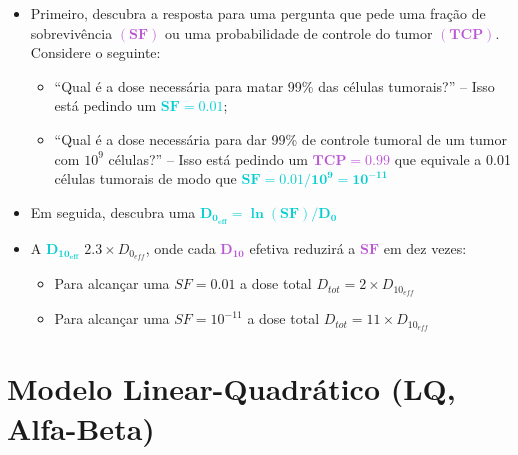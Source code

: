 \documentclass[11pt,a4paper]{article}
\begin{document}
	\begin{tcolorbox}[width=\textwidth, colback={white}, colbacktitle={DarkTurquoise!50!white}, title={$\bigstar$ \LobsterTwo{Para entender Melhor: Curva de Sobrevivência E Fracionamento} $\bigstar $}, coltitle={CarnationPink}, colframe={DarkTurquoise}, fonttitle=\rmfamily\bfseries\Large]
		
		\begin{itemize}
			\item Primeiro, descubra a resposta para uma pergunta que pede uma fração de sobrevivência \textcolor{MediumOrchid}{$\mathbf{(SF)}$}  ou uma probabilidade de controle do tumor \textcolor{MediumOrchid}{$\mathbf{(TCP)}$}. Considere o seguinte:
			\begin{itemize}[label=\textcolor{CarnationPink}{$\star$}]
				\item “Qual é a dose necessária para matar 99\% das células tumorais?” -- Isso está pedindo um \textcolor{DarkTurquoise}{$\mathbf{SF = 0.01}$};
				\item “Qual é a dose necessária para dar 99\% de controle tumoral de um tumor com $\mathrm{10^9}$ células?” -- Isso está pedindo um \textcolor{MediumOrchid}{$\mathbf{TCP = 0.99}$} que equivale a 0.01 células tumorais de modo que \textcolor{DarkTurquoise}{$\mathbf{SF = 0.01/10^9 = 10^{-11}}$}
			\end{itemize}
			\item Em seguida, descubra uma \textcolor{DarkTurquoise}{$\mathbf{D_{0_{eff}} = \ln (SF)/D_0}$}
			\item A \textcolor{DarkTurquoise}{$\mathbf{D_{10_{eff}}}$} $2.3 \times D_{0_{eff}}$, onde cada \textcolor{MediumOrchid}{$\mathbf{D_{10}}$} efetiva reduzirá a \textcolor{MediumOrchid}{$\mathbf{SF}$} em dez vezes:
			\begin{itemize}[label=\textcolor{CarnationPink}{$\star$}]
				\item Para alcançar uma $SF = 0.01$ a dose total $D_{tot} = 2 \times D_{10_{eff}}$
				\item Para alcançar uma $SF = 10^{-11}$ a dose total $D_{tot} = 11 \times D_{10_{eff}}$
			\end{itemize}
		\end{itemize}

	\end{tcolorbox}
	
\section{Modelo Linear-Quadrático (LQ, Alfa-Beta)}
\end{document}
